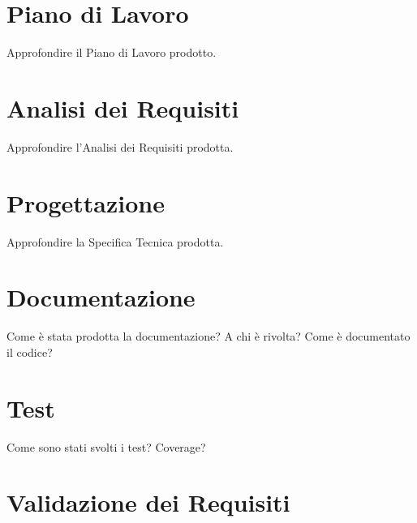 \section{Piano di Lavoro}

Approfondire il Piano di Lavoro prodotto.

\section{Analisi dei Requisiti}

Approfondire l'Analisi dei Requisiti prodotta.

\section{Progettazione}

Approfondire la Specifica Tecnica prodotta.


\section{Documentazione}

Come è stata prodotta la documentazione? A chi è rivolta? Come è documentato il codice?

\section{Test}

Come sono stati svolti i test? Coverage?


\section{Validazione dei Requisiti}
